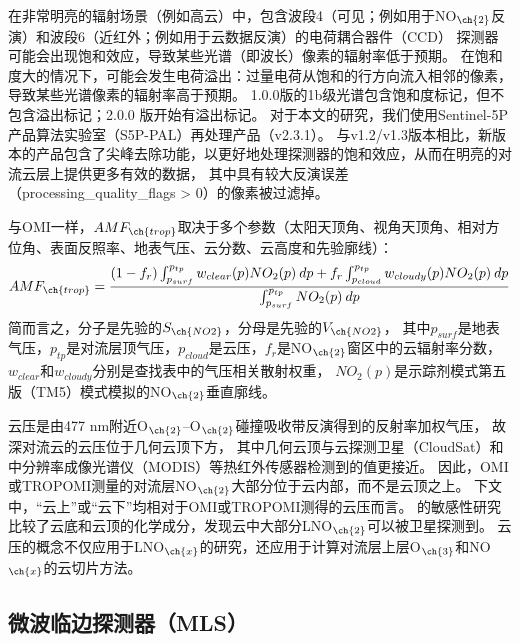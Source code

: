 在非常明亮的辐射场景（例如高云）中，包含波段4（可见；例如用于NO$_{\ch{2}}$反演）和波段6（近红外；例如用于云数据反演）的电荷耦合器件（CCD） 探测器可能会出现饱和效应\citep{Ludewig.2020}，导致某些光谱（即波长）像素的辐射率低于预期。
在饱和度大的情况下，可能会发生电荷溢出：过量电荷从饱和的行方向流入相邻的像素，导致某些光谱像素的辐射率高于预期。
1.0.0版的1b级光谱包含饱和度标记，但不包含溢出标记；2.0.0 版开始有溢出标记\citep{Ludewig.2020}。
对于本文的研究，我们使用Sentinel-5P产品算法实验室（S5P-PAL）再处理产品（v2.3.1）。
与v1.2/v1.3版本相比，新版本的产品包含了尖峰去除功能，以更好地处理探测器的饱和效应，从而在明亮的对流云层上提供更多有效的数据\citep{Ludewig.2020,VanGeffen.2022}，
其中具有较大反演误差（processing\_quality\_flags > 0）的像素被过滤掉。

与OMI一样，$AMF_{\ch{trop}}$取决于多个参数（太阳天顶角、视角天顶角、相对方位角、表面反照率、地表气压、云分数、云高度和先验廓线）：
\begin{equation} \label{eq:AMF_NO2}
AMF_{\ch{trop}} = \frac{(1-f_r) \int_{p_{surf}}^{p_{tp}} w_{clear}(p) NO_2(p) \: dp + f_r \int_{p_{cloud}}^{p_{tp}} w_{cloudy}(p) NO_2(p) \: dp}{\int_{p_{surf}}^{p_{tp}} NO_2(p) \: dp}
\end{equation}
简而言之，分子是先验的$S_{\ch{NO2}}$，分母是先验的$V_{\ch{NO2}}$，
其中$p_{surf}$是地表气压，$p_{tp}$是对流层顶气压，$p_{cloud}$是云压，$f_{r}$是NO$_{\ch{2}}$窗区中的云辐射率分数，
$w_{clear}$和$w_{cloudy}$分别是查找表中的气压相关散射权重\citep{Lorente.2017}，
$NO_2(p)$是示踪剂模式第五版（TM5）模式模拟的NO$_{\ch{2}}$垂直廓线。

云压是由477 nm附近O$_{\ch{2}}$--O$_{\ch{2}}$碰撞吸收带反演得到的反射率加权气压\citep{Acarreta.2004,Sneep.2008,Stammes.2008}，
故深对流云的云压位于几何云顶下方，
其中几何云顶与云探测卫星（CloudSat）和中分辨率成像光谱仪（MODIS）等热红外传感器检测到的值更接近\citep{Vasilkov.2008,Joiner.2012}。
因此，OMI或TROPOMI测量的对流层NO$_{\ch{2}}$大部分位于云内部，而不是云顶之上。
下文中，“云上”或“云下”均相对于OMI或TROPOMI测得的云压而言。
\citet{Beirle.2009}的敏感性研究比较了云底和云顶的化学成分，发现云中大部分LNO$_{\ch{2}}$可以被卫星探测到。
云压的概念不仅应用于LNO$_{\ch{x}}$的研究，还应用于计算对流层上层O$_{\ch{3}}$和NO$_{\ch{x}}$的云切片方法\citep{Ziemke.2009,Choi.2014,Strode.2017,Ziemke.2017,Marais.2018}。


\subsection{微波临边探测器（MLS）}


